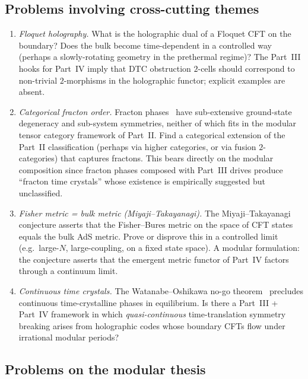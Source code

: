 \documentclass[12pt]{article}
\theoremstyle{definition}
\theoremstyle{remark}
\begin{document}
\subsection*{Problems involving cross-cutting themes}

\begin{enumerate}[label=O\arabic*., leftmargin=2.6em, resume]

\item \emph{Floquet holography.}
What is the holographic dual of a Floquet CFT on the boundary? Does the
bulk become time-dependent in a controlled way (perhaps a slowly-rotating
geometry in the prethermal regime)? The Part~III hooks for Part~IV imply
that DTC obstruction $2$-cells should correspond to non-trivial
$2$-morphisms in the holographic functor; explicit examples are absent.

\item \emph{Categorical fracton order.}
Fracton phases~\cite{vijayhaahfu2016} have sub-extensive ground-state
degeneracy and sub-system symmetries, neither of which fits in the
modular tensor category framework of Part~II. Find a categorical
extension of the Part~II classification (perhaps via higher categories,
or via fusion $2$-categories) that captures fractons. This bears
directly on the modular composition since fracton phases composed with
Part~III drives produce ``fracton time crystals'' whose existence is
empirically suggested but unclassified.

\item \emph{Fisher metric = bulk metric (Miyaji--Takayanagi).}
The Miyaji--Takayanagi conjecture asserts that the Fisher--Bures metric on
the space of CFT states equals the bulk AdS metric. Prove or disprove
this in a controlled limit (e.g.\ large-$N$, large-coupling, on a fixed
state space). A modular formulation: the conjecture asserts that the
emergent metric functor of Part~IV factors through a continuum limit.

\item \emph{Continuous time crystals.}
The Watanabe--Oshikawa no-go theorem~\cite{watanabe2015} precludes continuous time-crystalline
phases in equilibrium. Is there a Part~III + Part~IV framework in which
\emph{quasi-continuous} time-translation symmetry breaking arises from
holographic codes whose boundary CFTs flow under irrational
modular periods?

\end{enumerate}

\subsection*{Problems on the modular thesis}
\end{document}
